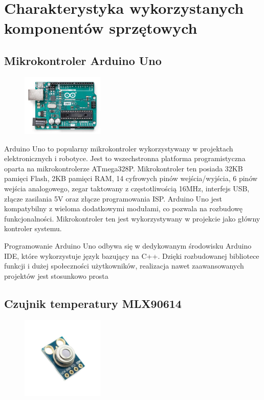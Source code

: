 \chapter{Charakterystyka wykorzystanych komponentów sprzętowych}
    \section{Mikrokontroler Arduino Uno}

    \begin{figure}[h!]
        \centering
        \includegraphics[width=0.35\textwidth]{images/uno.jpg}
        \label{fig:example}
    \end{figure}

    Arduino Uno to popularny mikrokontroler wykorzystywany w projektach elektronicznych i robotyce. Jest to wszechstronna platforma programistyczna oparta na mikrokontrolerze ATmega328P. Mikrokontroler ten posiada 32KB pamięci Flash, 2KB pamięci RAM, 14 cyfrowych pinów wejścia/wyjścia, 6 pinów wejścia analogowego, zegar taktowany z częstotliwością 16MHz, interfejs USB, złącze zasilania 5V oraz złącze programowania ISP. Arduino Uno jest kompatybilny z wieloma dodatkowymi modułami, co pozwala na rozbudowę funkcjonalności. Mikrokontroler ten jest wykorzystywany w projekcie jako główny kontroler systemu.

    \vspace{12pt}

    Programowanie Arduino Uno odbywa się w dedykowanym środowisku Arduino IDE, które wykorzystuje język bazujący na C++. Dzięki rozbudowanej bibliotece funkcji i dużej społeczności użytkowników, realizacja nawet zaawansowanych projektów jest stosunkowo prosta \cite{4}
    
    \section{Czujnik temperatury MLX90614}

    \begin{figure}[h!]
        \centering
        \includegraphics[width=0.35\textwidth]{images/mlx.jpg}
        \label{fig:example}
    \end{figure}

